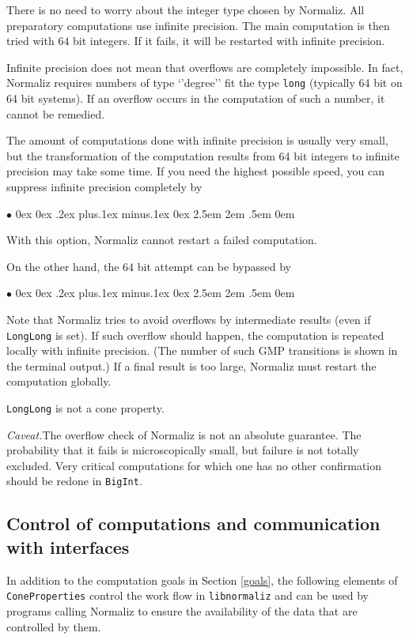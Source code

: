 \documentclass[12pt,a4paper]{scrartcl}
\newcommand{\stdli}{ \topsep0ex \partopsep0ex %
\parsep.2ex plus.1ex minus.1ex \itemsep0ex%
\leftmargin2.5em \labelwidth2em \labelsep.5em \rightmargin0em}%
\renewenvironment{itemize}{\begin{list}{{$\bullet$}}{\stdli}}{\end{list}}
\theoremstyle{definition}
\def\itemtt[#1]{\item[\textbf{\ttt{#1}}]}
\def\ttt{\texttt}
\begin{document}
There is no need to worry about the integer type chosen by Normaliz. All preparatory computations use infinite precision. The main computation is then tried with $64$ bit integers. If it fails, it will be restarted with infinite precision.

Infinite precision does not mean that overflows are completely impossible. In fact, Normaliz requires numbers of type `'degree'' fit the type \verb|long| (typically 64 bit on 64 bit systems). If an overflow occurs in the computation of such a number, it cannot be remedied.

The amount of computations done with infinite precision is usually very small, but the transformation of the computation results from 64 bit integers to infinite precision may take some time. If you need the highest possible speed, you can suppress infinite precision completely by 
\begin{itemize}
	\itemtt[LongLong]	
\end{itemize}
With this option, Normaliz cannot restart a failed computation.

On the other hand, the $64$ bit attempt can be bypassed by
\begin{itemize}
	\itemtt[BigInt, -B]	
\end{itemize}

Note that Normaliz tries to avoid overflows by intermediate results (even if \verb|LongLong| is set). If such overflow should happen, the computation is repeated locally with infinite precision. (The number of such GMP transitions is shown in the terminal output.) If a final result is too large, Normaliz must restart the computation globally.

\verb|LongLong| is  not a cone property.

\emph{Caveat.}\enspace The overflow check of Normaliz is not an absolute guarantee. The probability that it fails is microscopically small, but failure is not totally excluded. Very critical computations for which one has no other confirmation should be redone in \verb|BigInt|.

\subsection{Control of computations and communication with interfaces}

In addition to the computation goals in Section \ref{goals}, 
the following elements of \verb|ConeProperties| control the work flow in \verb|libnormaliz| and can be used by programs calling Normaliz to ensure the availability of the data that are controlled by them.
\end{document}
